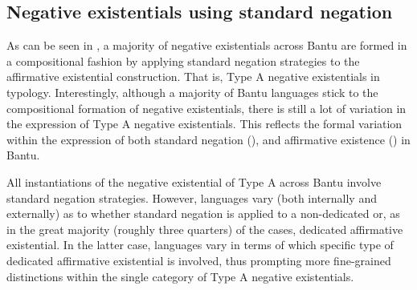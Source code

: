 \documentclass[output=paper]{langsci/langscibook}
\begin{document}
\subsection{Negative existentials using standard negation}\label{sec:1:5.1}
As can be seen in , a majority of negative 
existentials across Bantu are formed in a compositional fashion by applying 
standard negation strategies to the affirmative existential construction. That is, Type A negative existentials in  typology. Interestingly, although a majority of Bantu languages stick to the compositional formation of negative existentials, there is still a lot of variation in the expression of Type A negative existentials. This reflects the formal variation within the expression of both standard negation (), and affirmative existence () in Bantu.

All instantiations of the negative existential of Type A across Bantu involve standard negation strategies. However, languages vary (both internally and externally) as to whether standard negation is applied to a non-dedicated or, as in the great majority (roughly three quarters) of the cases, dedicated affirmative existential. In the latter case, languages vary in terms of which specific type of dedicated affirmative existential is involved, thus prompting more fine-grained distinctions within the single category of Type A negative existentials.
\end{document}
